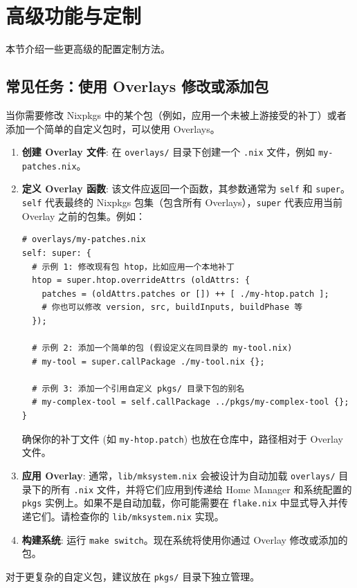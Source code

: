 \documentclass[11pt, a4paper]{article} %
\begin{document}
\section{高级功能与定制}
本节介绍一些更高级的配置定制方法。

\subsection{常见任务：使用 Overlays 修改或添加包}
当你需要修改 Nixpkgs 中的某个包（例如，应用一个未被上游接受的补丁）或者添加一个简单的自定义包时，可以使用 Overlays。
\begin{enumerate}[label=\textbf{\arabic*.}, wide, labelwidth=!, labelindent=0pt]
    \item \textbf{创建 Overlay 文件}: 在 \texttt{overlays/} 目录下创建一个 \texttt{.nix} 文件，例如 \texttt{my-patches.nix}。
    \item \textbf{定义 Overlay 函数}: 该文件应返回一个函数，其参数通常为 \texttt{self} 和 \texttt{super}。\texttt{self} 代表最终的 Nixpkgs 包集（包含所有 Overlays），\texttt{super} 代表应用当前 Overlay 之前的包集。例如：
        \begin{lstlisting}
# overlays/my-patches.nix
self: super: {
  # 示例 1: 修改现有包 htop，比如应用一个本地补丁
  htop = super.htop.overrideAttrs (oldAttrs: {
    patches = (oldAttrs.patches or []) ++ [ ./my-htop.patch ];
    # 你也可以修改 version, src, buildInputs, buildPhase 等
  });

  # 示例 2: 添加一个简单的包 (假设定义在同目录的 my-tool.nix)
  # my-tool = super.callPackage ./my-tool.nix {};

  # 示例 3: 添加一个引用自定义 pkgs/ 目录下包的别名
  # my-complex-tool = self.callPackage ../pkgs/my-complex-tool {};
}
        \end{lstlisting}
        确保你的补丁文件 (如 \texttt{my-htop.patch}) 也放在仓库中，路径相对于 Overlay 文件。
    \item \textbf{应用 Overlay}: 通常，\texttt{lib/mksystem.nix} 会被设计为自动加载 \texttt{overlays/} 目录下的所有 \texttt{.nix} 文件，并将它们应用到传递给 Home Manager 和系统配置的 \texttt{pkgs} 实例上。如果不是自动加载，你可能需要在 \texttt{flake.nix} 中显式导入并传递它们。请检查你的 \texttt{lib/mksystem.nix} 实现。
    \item \textbf{构建系统}: 运行 \texttt{make switch}。现在系统将使用你通过 Overlay 修改或添加的包。
\end{enumerate}
对于更复杂的自定义包，建议放在 \texttt{pkgs/} 目录下独立管理。
\end{document}
